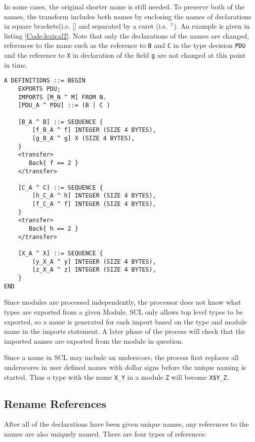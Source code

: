 \documentclass[12pt,oneside,letterpaper]{article}
\begin{document}
In some cases, the original shorter name is still needed. To preserve both of the names, the transform includes both names by enclosing the names of declarations in square brackets(i.e. [] and separated by a caret (i.e. \textsuperscript{$\wedge$}). An example is given in listing \ref{Code:lexical2}. Note that only the declarations of the names are changed, references to the name such as the reference to
\texttt{B} and \texttt{C} in the type decision \texttt{PDU} and the reference to \texttt{X} in declaration of the field \texttt{g} are not changed at this point in time.

\begin{lstlisting}[language=SCL2,style=mystyle,frame=none,
caption=Rename Declarations,label=Code:lexical2, xleftmargin=3.5ex, extendedchars=true]
A DEFINITIONS ::= BEGIN
    EXPORTS PDU;
    IMPORTS [M_N ^ M] FROM N.
    [PDU_A ^ PDU] ::= (B | C )
    
    [B_A ^ B] ::= SEQUENCE {
        [f_B_A ^ f] INTEGER (SIZE 4 BYTES),
        [g_B_A ^ g] X (SIZE 4 BYTES),
    }
    <transfer>
       Back{ f == 2 }
    </transfer>
    
    [C_A ^ C] ::= SEQUENCE {
        [h_C_A ^ h] INTEGER (SIZE 4 BYTES),
        [f_C_A ^ f] INTEGER (SIZE 4 BYTES),
    }
    <transfer>
       Back{ h == 2 }
    </transfer>
    
    [X_A ^ X] ::= SEQUENCE {
        [y_X_A ^ y] INTEGER (SIZE 4 BYTES),
        [z_X_A ^ z] INTEGER (SIZE 4 BYTES),
    }
END
\end{lstlisting}

Since modules are processed independently, the processor does not know what types are exported from a given Module. SCL only allows top level types to be exported, so a name is generated for each import based on the type and module name in the imports statement. A later phase of the process will check that the imported names are exported from the module in question.

Since a name in SCL may include an underscore, the process first replaces all underscores in user defined names with dollar signs before the unique naming is started. Thus a type with the name \texttt{X\_Y} in a module \texttt{Z} will become \texttt{X\$Y\_Z}.

\subsection{Rename References}
\label{sec:RenameReferences}
After all of the declarations have been given unique names, any references to the names are also uniquely named. There are four types of references:
\end{document}
